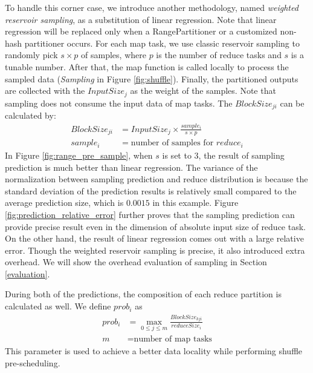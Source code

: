 To handle this corner case, we introduce another methodology, named \emph{weighted reservoir sampling}, as a substitution of linear regression. 
Note that linear regression will be replaced only when a RangePartitioner or a customized non-hash partitioner occurs. 
For each map task, we use classic reservoir sampling to randomly pick $s \times p$ of samples, where $p$ is the number of reduce tasks and $s$ is a tunable number. 
After that, the map function is called locally to process the sampled data (\textit{Sampling} in Figure \ref{fig:shuffle}). 
Finally, the partitioned outputs are collected with the $InputSize_j$ as the weight of the samples.
Note that sampling does not consume the input data of map tasks. 
The $BlockSize_{ji}$ can be calculated by:
\begin{equation}
\label{equationsample}
\begin{aligned}
	BlockSize_{ji} &= {{InputSize_j \times \frac{sample_i}{s \times p}}} \\
	sample_i &= \text{number of samples for $reduce_i$}
\end{aligned}
\end{equation}
In Figure \ref{fig:range_pre_sample}, when $s$ is set to $3$, the result of sampling prediction is much better than linear regression. 
The variance of the normalization between sampling prediction and reduce distribution is because the standard deviation of the prediction results is relatively small compared to the average prediction size, which is $0.0015$ in this example. 
Figure \ref{fig:prediction_relative_error} further proves that the sampling prediction can provide precise result even in the dimension of absolute input size of reduce task. 
On the other hand, the result of linear regression comes out with a large relative error. 
Though the weighted reservoir sampling is precise, it also introduced extra overhead. 
We will show the overhead evaluation of sampling in Section \ref{evaluation}.

During both of the predictions, the composition of each reduce partition is calculated as well. We define $prob_i$ as
\begin{equation}
\label{equationprob}
\begin{aligned}
	prob_i &= \max_{0 \leq j \leq m} \frac{BlockSize_{kji}}{reduceSize_i} \\
    m &= \text{number of map tasks}
\end{aligned}
\end{equation}
This parameter is used to achieve a better data locality while performing shuffle pre-scheduling. 

